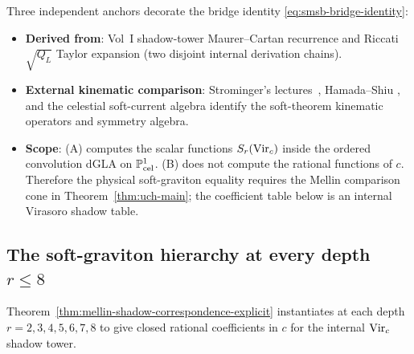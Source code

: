 \begin{remark}
\label{rem:smsb-hziv-bridge}
Three independent anchors decorate the bridge identity \eqref{eq:smsb-bridge-identity}:
\begin{itemize}
\item[(A)] \textbf{Derived from}: Vol~I shadow-tower Maurer--Cartan
recurrence and Riccati $\sqrt{Q_L}$ Taylor expansion (two disjoint
internal derivation chains).
\item[(B)] \textbf{External kinematic comparison}: Strominger's
lectures~\cite{StromingerLectures2018}, Hamada--Shiu
\cite{HamadaShiuSubsubSoft}, and the celestial soft-current algebra
\cite{GuevaraHimwichPateStrominger21,StromingerWInfinityCelestial}
identify the soft-theorem kinematic operators and symmetry algebra.
\item[(C)] \textbf{Scope}: (A) computes the scalar functions
\(S_r(\mathrm{Vir}_c)\) inside the ordered convolution dGLA on
\(\mathbb P^1_{\mathrm{cel}}\).  (B) does not compute the rational functions
of \(c\).  Therefore the physical soft-graviton equality requires the
Mellin comparison cone in Theorem~\ref{thm:uch-main}; the coefficient
table below is an internal Virasoro shadow table.
\end{itemize}
\end{remark}

\subsection{The soft-graviton hierarchy at every depth $r \leq 8$}
\label{subsec:smsb-hierarchy}

Theorem~\ref{thm:mellin-shadow-correspondence-explicit} instantiates at
each depth $r = 2, 3, 4, 5, 6, 7, 8$ to give closed rational
coefficients in \(c\) for the internal \(\mathrm{Vir}_c\) shadow tower.


